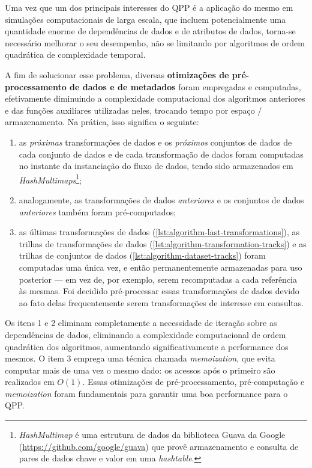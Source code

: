 Uma vez que um dos principais interesses do QPP é a aplicação do mesmo em simulações computacionais de larga escala, que incluem potencialmente uma quantidade enorme de dependências de dados e de atributos de dados, torna-se necessário melhorar o seu desempenho, não se limitando por algoritmos de ordem quadrática de complexidade temporal.

A fim de solucionar esse problema, diversas \textbf{otimizações de pré-processamento de dados e de metadados} foram empregadas e computadas, efetivamente diminuindo a complexidade computacional dos algoritmos anteriores e das funções auxiliares utilizadas neles, trocando tempo por espaço / armazenamento. Na prática, isso significa o seguinte:

\begin{enumerate}
    \item as \emph{próximas} transformações de dados e os \emph{próximos} conjuntos de dados de cada conjunto de dados e de cada transformação de dados foram computadas no instante da instanciação do fluxo de dados, tendo sido armazenados em \textit{HashMultimaps}\footnote{\textit{HashMultimap} é uma estrutura de dados da biblioteca Guava da Google (\url{https://github.com/google/guava}) que provê armazenamento e consulta de pares de dados chave e valor em uma \textit{hashtable}.};
    \item analogamente, as transformações de dados \emph{anteriores} e os conjuntos de dados \emph{anteriores} também foram pré-computados;
    \item as últimas transformações de dados (\autoref{lst:algorithm-last-transformations}), as trilhas de transformações de dados (\autoref{lst:algorithm-transformation-tracks}) e as trilhas de conjuntos de dados (\autoref{lst:algorithm-dataset-tracks}) foram computadas uma única vez, e então permanentemente armazenadas para uso posterior --- em vez de, por exemplo, serem recomputadas a cada referência às mesmas. Foi decidido pré-processar essas transformações de dados devido ao fato delas frequentemente serem transformações de interesse em consultas.
\end{enumerate}

Os itens 1 e 2 eliminam completamente a necessidade de iteração sobre as dependências de dados, eliminando a complexidade computacional de ordem quadrática dos algoritmos, aumentando significativamente a performance dos mesmos. O item 3 emprega uma técnica chamada \textit{memoization}, que evita computar mais de uma vez o mesmo dado: os acessos após o primeiro são realizados em \(O(1)\). Essas otimizações de pré-processamento, pré-computação e \textit{memoization} foram fundamentais para garantir uma boa performance para o QPP.

